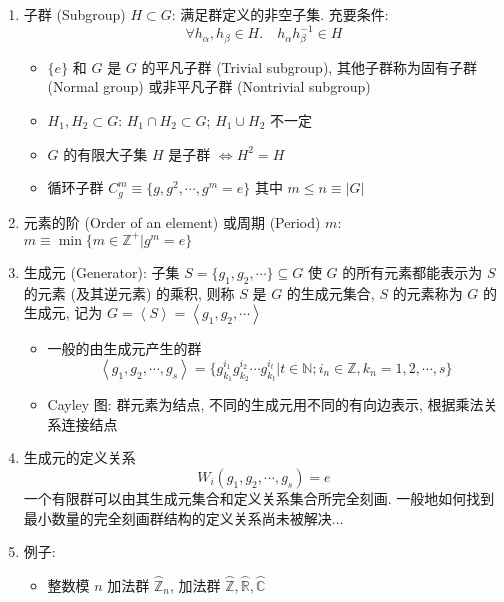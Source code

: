 \documentclass[12pt,a4paper]{article}%
\numberwithin{equation}{section}%
\begin{document}
\begin{enumerate}
\begin{itemize}
\begin{center}
\begin{tabular}{c|ccccc}
		\end{tabular}
		\end{center}
	\end{itemize}
	\item 子群 (Subgroup) $H\subset G$: 满足群定义的非空子集. 充要条件:
	\begin{equation}
		\forall h_\alpha, h_\beta \in H.\quad h_\alpha h_\beta^{-1}\in H
	\end{equation}
	\begin{itemize}
		\item $\{e\}$ 和 $G$ 是 $G$ 的平凡子群 (Trivial subgroup), 其他子群称为固有子群 (Normal group) 或非平凡子群 (Nontrivial subgroup)
		\item $H_1,H_2\subset G$: $H_1\cap H_2\subset G$; $H_1\cup H_2$ 不一定
		\item $G$ 的有限大子集 $H$ 是子群 $\Longleftrightarrow H^2 = H$
		\item 循环子群 $C_g^m\equiv\{g,g^2,\cdots,g^m = e\}$ 其中 $m\le n\equiv |G|$
	\end{itemize}
	\item 元素的阶 (Order of an element) 或周期 (Period) $m$: $m\equiv\min\{m\in\mathbb Z^+|g^m = e\}$
	\item 生成元 (Generator): 子集 $S = \{g_1,g_2,\cdots\}\subseteq G$ 使 $G$ 的所有元素都能表示为 $S$ 的元素 (及其逆元素) 的乘积, 则称 $S$ 是 $G$ 的生成元集合, $S$ 的元素称为 $G$ 的生成元, 记为 $G = \left\langle S\right\rangle = \left\langle g_1, g_2, \cdots \right\rangle$
	\begin{itemize}
		\item 一般的由生成元产生的群
		\begin{equation}
			\left\langle g_1, g_2, \cdots, g_s\right\rangle 
			= \{g_{k_1}^{i_1}g_{k_2}^{i_2}\cdots g_{k_t}^{i_t}|t\in\mathbb N; i_n\in\mathbb Z, k_n = 1,2,\cdots,s\}
		\end{equation}
		\item Cayley 图: 群元素为结点, 不同的生成元用不同的有向边表示, 根据乘法关系连接结点
	\end{itemize}
	\item 生成元的定义关系
	\begin{equation}
		W_i(g_1, g_2,\cdots, g_s) = e
	\end{equation}
	一个有限群可以由其生成元集合和定义关系集合所完全刻画. 
	一般地如何找到最小数量的完全刻画群结构的定义关系尚未被解决...
	\item 例子: 
	\begin{itemize}
		\item 整数模 $n$ 加法群 $\wideparen{\mathbb Z}_n$, 加法群 $\wideparen{\mathbb Z}, \wideparen{\mathbb R}, \wideparen{\mathbb C}$

\end{itemize}
\end{enumerate}
\end{document}

